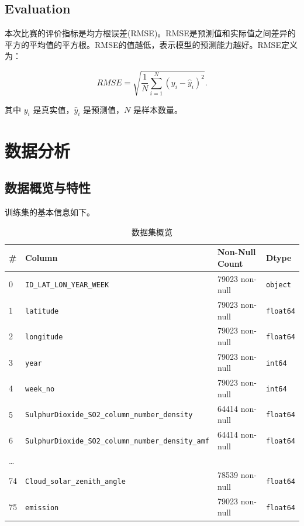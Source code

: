 \documentclass{ctexart}
\begin{document}
\subsection{Evaluation}

本次比赛的评价指标是均方根误差(RMSE)。RMSE是预测值和实际值之间差异的平方的平均值的平方根。RMSE的值越低，表示模型的预测能力越好。RMSE定义为：

\[
      RMSE=\sqrt{\frac{1}{N}\sum\limits_{i=1}^{N}(y_i-\hat y_i)^2}.
\]

其中 $y_i$ 是真实值，$\hat y_i$ 是预测值，$N$ 是样本数量。

\section{数据分析}

\subsection{数据概览与特性}

训练集的基本信息如下。

\begin{table}[h]
      \centering
      \caption{数据集概览}
      \begin{tabular}{llll}
            \hline
            \#       & Column                                                     & Non-Null Count & Dtype            \\ \hline
            0        & \texttt{ID\_LAT\_LON\_YEAR\_WEEK}                          & 79023 non-null & \texttt{object}  \\
            1        & \texttt{latitude}                                          & 79023 non-null & \texttt{float64} \\
            2        & \texttt{longitude}                                         & 79023 non-null & \texttt{float64} \\
            3        & \texttt{year}                                              & 79023 non-null & \texttt{int64}   \\
            4        & \texttt{week\_no}                                          & 79023 non-null & \texttt{int64}   \\
            5        & \texttt{SulphurDioxide\_SO2\_column\_number\_density}      & 64414 non-null & \texttt{float64} \\
            6        & \texttt{SulphurDioxide\_SO2\_column\_number\_density\_amf} & 64414 non-null & \texttt{float64} \\
            \ldots{} &                                                            &                &                  \\
            74       & \texttt{Cloud\_solar\_zenith\_angle}                       & 78539 non-null & \texttt{float64} \\
            75       & \texttt{emission}                                          & 79023 non-null & \texttt{float64} \\
            \hline
      \end{tabular}
\end{table}
\end{document}
